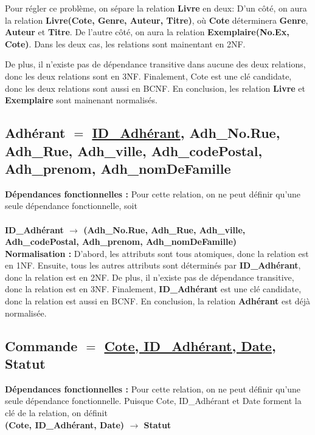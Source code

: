 \documentclass[12pt]{article}
\begin{document}
Pour régler ce problème, on sépare la relation \textbf{Livre} en deux: 
D'un côté, on aura la relation \textbf{Livre(Cote, Genre, Auteur, Titre)}, 
où \textbf{Cote} déterminera \textbf{Genre}, \textbf{Auteur} et \textbf{Titre}. 
De l'autre côté, on aura la relation \textbf{Exemplaire(No.Ex, Cote)}.  
Dans les deux cas, les relations sont mainentant en 2NF. 

De plus, il n’existe pas de dépendance transitive dans aucune des deux relations, donc les deux relations sont en 3NF. Finalement, Cote est une clé candidate, donc les deux relations sont aussi en BCNF. En conclusion, les relation \textbf{Livre} et \textbf{Exemplaire} sont mainenant normalisés.


\subsection*{\textbf{Adhérant} $=$ \underline{ID\_Adhérant}, Adh\_No.Rue, Adh\_Rue, Adh\_ville, Adh\_codePostal, Adh\_prenom, Adh\_nomDeFamille}

\textbf{Dépendances fonctionnelles :} Pour cette relation, on ne peut définir qu'une seule dépendance fonctionnelle, soit  \\ \\
\textbf{ID\_Adhérant $\rightarrow$ (Adh\_No.Rue, Adh\_Rue, Adh\_ville, Adh\_codePostal, Adh\_prenom, Adh\_nomDeFamille)} \\  

\textbf{Normalisation :} D'abord, les attributs sont tous atomiques, donc la relation est en 1NF. 
Ensuite, tous les autres attributs sont déterminés par  \textbf{ID\_Adhérant}, donc la relation est en 2NF. 
De plus, il n’existe pas de dépendance transitive, donc la relation est en 3NF. 
Finalement, \textbf{ID\_Adhérant} est une clé candidate, donc la relation est aussi en BCNF. 
En conclusion, la relation \textbf{Adhérant} est déjà normalisée.
        

\subsection*{\textbf{Commande} $=$ \underline{Cote, ID\_Adhérant, Date}, Statut}

\textbf{Dépendances fonctionnelles :} Pour cette relation, on ne peut définir qu'une seule dépendance fonctionnelle. 
Puisque Cote, ID\_Adhérant et Date forment la clé de la relation, on définit \\ 
\textbf{(Cote, ID\_Adhérant, Date) $\rightarrow$ Statut}
\end{document}
